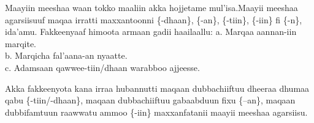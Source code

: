 \documentclass[11pt,b5paper]{book}
\begin{document}
Maayiin meeshaa waan tokko maaliin akka hojjetame mul'isa.Maayii meeshaa agarsiisuuf maqaa irratti maxxantoonni \{-dhaan\}, \{-an\}, \{-tiin\}, \{-iin\} fi \{-n\}, ida'amu. Fakkeenyaaf himoota armaan gadii haailaallu:
a. Marqaa aannan-iin marqite.\\
b. Marqicha fal’aana-an nyaatte.\\
c. Adamsaan qawwee-tiin/dhaan warabboo ajjeesse.

Akka fakkeenyota kana irraa hubannutti maqaan dubbachiiftuu dheeraa dhumaa qabu \{-tiin/-dhaan\}, maqaan dubbachiiftuu gabaabduun fixu \{–an\}, maqaan dubbifamtuun raawwatu ammoo \{-iin\} maxxanfatanii maayii meeshaa agarsiisu.


\newpage


\end{document}
